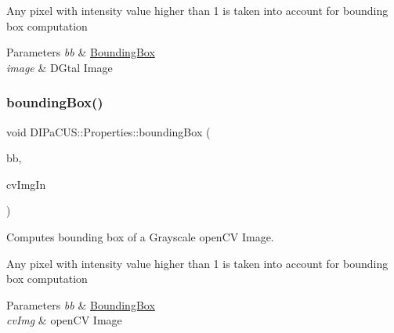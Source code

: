 Any pixel with intensity value higher than 1 is taken into account for bounding box computation


\begin{DoxyParams}{Parameters}
{\em bb} & \hyperlink{structDIPaCUS_1_1Properties_1_1BoundingBox}{Bounding\+Box} \\
\hline
{\em image} & D\+Gtal Image \\
\hline
\end{DoxyParams}
\mbox{\label{namespaceDIPaCUS_1_1Properties_ad677c27627b57987a2957d3c378d7415}} 
\subsubsection{\texorpdfstring{bounding\+Box()}{boundingBox()}\hspace{0.1cm}{\footnotesize\ttfamily [2/2]}}
{\footnotesize\ttfamily void D\+I\+Pa\+C\+U\+S\+::\+Properties\+::bounding\+Box (\begin{DoxyParamCaption}\item[{\hyperlink{structDIPaCUS_1_1Properties_1_1BoundingBox}{Bounding\+Box} \&}]{bb,  }\item[{const cv\+::\+Mat \&}]{cv\+Img\+In }\end{DoxyParamCaption})}



Computes bounding box of a Grayscale open\+CV Image. 

Any pixel with intensity value higher than 1 is taken into account for bounding box computation


\begin{DoxyParams}{Parameters}
{\em bb} & \hyperlink{structDIPaCUS_1_1Properties_1_1BoundingBox}{Bounding\+Box} \\
\hline
{\em cv\+Img} & open\+CV Image \\
\hline
\end{DoxyParams}
\mbox{\label{namespaceDIPaCUS_1_1Properties_a3d38c4947ecda62e133502ef919d76a0}} 
